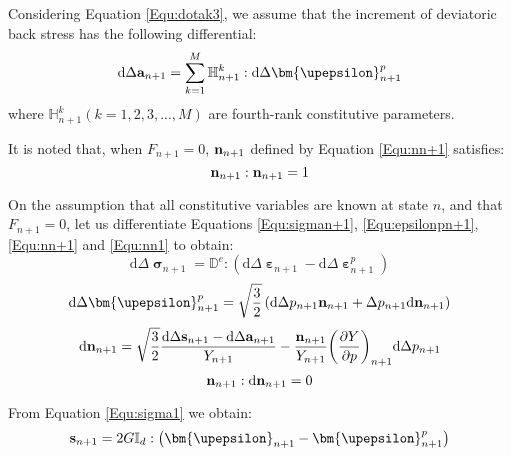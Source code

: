 Considering Equation \ref{Equ:dotak3}, we assume that the increment of deviatoric back stress has the following differential:
\begin{equation}
\label{Equ:dan+1}
{\text{d}}\Delta {{\bf{a}}_{n + 1}} = \sum\limits_{k = 1}^M {\mathbb{H}_{n + 1}^k} :{\text{d}}\Delta {\bm{\upepsilon }}_{n + 1}^p
\end{equation}
where $\mathbb{H}_{n + 1}^k( k = 1,2,3,...,M )$ are fourth-rank constitutive parameters.

It is noted that, when ${F_{n + 1}} = 0$, ${\bf{n}}_{n + 1}$ defined by Equation \ref{Equ:nn+1} satisfies:
\begin{equation}
\label{Equ:nn1}
{{\bf{n}}_{n + 1}}:{{\bf{n}}_{n + 1}} = 1
\end{equation}

On the assumption that all constitutive variables are known at state $n$, and that $F_{n+1}=0$, let us differentiate Equations \ref{Equ:sigman+1}, \ref{Equ:epsilonpn+1}, \ref{Equ:nn+1} and \ref{Equ:nn1} to obtain:
\begin{equation}
\label{Equ:dsigman+1}
{\text{d}}\Delta {{\bm{\upsigma }}_{n + 1}} = {\mathbb{D}^e}:\left( {{\text{d}}\Delta {{\bm{\upepsilon }}_{n + 1}} - {\text{d}}\Delta {\bm{\upepsilon }}_{n + 1}^p} \right)
\end{equation}
\begin{equation}
\label{Equ:depsilon+1}
{\text{d}}\Delta {\bm{\upepsilon }}_{n + 1}^p = \sqrt {\frac{3}{2}} \left( {{\text{d}}\Delta {p_{n + 1}}{{\bf{n}}_{n + 1}} + \Delta {p_{n + 1}}{\text{d}}{{\bf{n}}_{n + 1}}} \right)
\end{equation}
\begin{equation}
\label{Equ:dnn+1}
{\text{d}}{{\bf{n}}_{n + 1}} = \sqrt {\frac{3}{2}} \frac{{{\text{d}}\Delta {{\bf{s}}_{n + 1}} - {\text{d}}\Delta {{\bf{a}}_{n + 1}}}}{{{Y_{n + 1}}}} - \frac{{{{\bf{n}}_{n + 1}}}}{{{Y_{n + 1}}}}{\left( {\frac{{\partial Y}}{{\partial p}}} \right)_{n + 1}}{\text{d}}\Delta {p_{n + 1}}
\end{equation}
\begin{equation}
{{\bf{n}}_{n + 1}}:{\text{d}}{{\bf{n}}_{n + 1}} = 0
\end{equation}

From Equation \ref{Equ:sigma1} we obtain:
\begin{equation}
\label{Equ:sn+1}
{{\bf{s}}_{n + 1}} = 2G{\mathbb{I}_d}:\left( {{{\bm{\upepsilon }}_{n + 1}} - {\bm{\upepsilon }}_{n + 1}^p} \right)
\end{equation}

